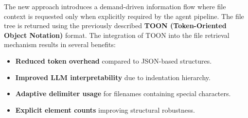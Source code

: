 \documentclass[12pt,a4paper]{article}
\begin{document}
The new approach introduces a demand-driven information flow where file context is requested only 
when explicitly required by the agent pipeline. The file tree is returned using the previously 
described \textbf{TOON (Token-Oriented Object Notation)} format. The integration of TOON into the 
file retrieval mechanism results in several benefits:

\begin{itemize}
    \item \textbf{Reduced token overhead} compared to JSON-based structures.
    \item \textbf{Improved LLM interpretability} due to indentation hierarchy.
    \item \textbf{Adaptive delimiter usage} for filenames containing special characters.
    \item \textbf{Explicit element counts} improving structural robustness.
\end{itemize}
\end{document}
